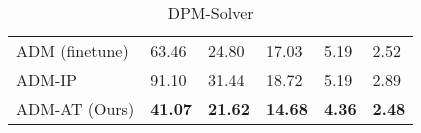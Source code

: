 \begin{table}[!t]
\begin{subtable}[h]{0.48\textwidth}
{\begin{tabular}{l l l l l l}
         \midrule
         ADM (finetune) & 63.46 & 24.80 & 17.03 & 5.19 & 2.52 \\
         ADM-IP & 91.10 & 31.44 & 18.72 & 5.19 & 2.89\\
         ADM-AT (Ours) & \bf41.07 & \bf21.62 & \bf14.68 & \bf4.36 & \bf2.48\\
        \bottomrule
        \end{tabular}
        }
     \end{subtable}
    \hfill
    \begin{subtable}[h]{0.48\textwidth}
        \centering
        \caption{DPM-Solver}
     \end{subtable}
    \label{tab:C10}
\end{table}